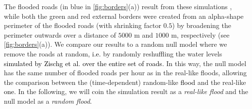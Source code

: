 \documentclass[twocolumn,fleqn,10pt]{wlscirep}
\begin{document}
The flooded roads (in blue in \cref{fig:borders}(a)) result from these simulations \cite{Zischg}, while both the green and red external borders were created from an alpha-shape perimeter of the flooded roads (with shrinking factor $0.5$) by broadening the perimeter outwards over a distance of $5000$ m and $1000$ m, respectively (see \cref{fig:borders}(a)).
We compare our results to a random null model where we remove the roads at random\textcolor{black}{, i.e.} by randomly reshuffling the water levels \textcolor{black}{simulated by Zischg et al. \cite{Zischg} over the entire set of roads}. In this way, the null model has the same number of flooded roads per hour as in the real-like floods, allowing the comparison between the (time-dependent) random-like \textcolor{black}{flood} and the real-like \textcolor{black}{one}. In the following, we will coin the simulation result as a \emph{real-like flood} and the null model as a \emph{random flood}.
\end{document}
